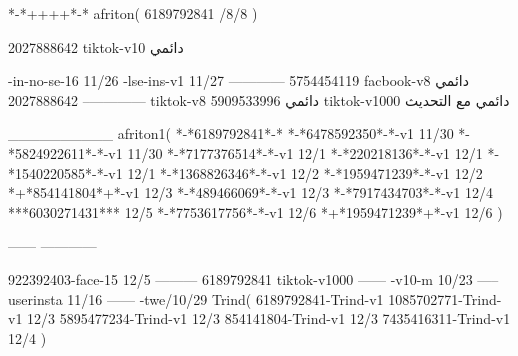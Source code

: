 *-*++++*-*
afriton(
6189792841 /8/8
)

2027888642 tiktok-v10
دائمي

-in-no-se-16 11/26
-lse-ins-v1 11/27
------------
5754454119 facbook-v8
دائمي
--------------
2027888642 tiktok-v8
دائمي
5909533996 tiktok-v1000
دائمي مع التحديث

__________
afriton1(
*-*6189792841*-*
*-*6478592350*-*-v1 11/30
*-*5824922611*-*-v1 11/30
*-*7177376514*-*-v1 12/1
*-*220218136*-*-v1 12/1
*-*1540220585*-*-v1 12/1
*-*1368826346*-*-v1 12/2
*-*1959471239*-*-v1 12/2
*+*854141804*+*-v1 12/3
*-*489466069*-*-v1 12/3
*-*7917434703*-*-v1 12/4
***6030271431*** 12/5
*-*7753617756*-*-v1 12/6
*+*1959471239*+*-v1 12/6
)

------
------------


922392403-face-15 12/5
---------
6189792841 tiktok-v1000
------
-v10-m 10/23
-----
userinsta 11/16
------
-twe/10/29
Trind(
6189792841-Trind-v1 
1085702771-Trind-v1 12/3
5895477234-Trind-v1 12/3
854141804-Trind-v1 12/3
7435416311-Trind-v1 12/4
)
